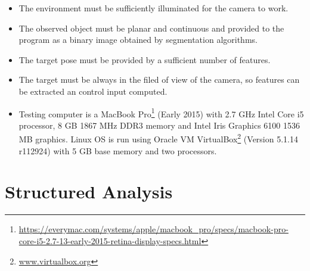 \begin{itemize}
	\item The environment must be sufficiently illuminated for the camera to work.
	\item The observed object must be planar and continuous and provided to the program as a binary image obtained by segmentation algorithms.
	\item The target pose must be provided by a sufficient number of features.
	\item The target must be always in the filed of view of the camera, so features can be extracted an control input computed.
	\item Testing computer is a MacBook Pro\footnote{\url{https://everymac.com/systems/apple/macbook_pro/specs/macbook-pro-core-i5-2.7-13-early-2015-retina-display-specs.html}} (Early 2015) with 2.7 GHz Intel Core i5 processor, 8 GB 1867 MHz DDR3 memory and Intel Iris Graphics 6100 1536 MB graphics. Linux OS is run using Oracle VM VirtualBox\footnote{\url{www.virtualbox.org}} (Version 5.1.14 r112924) with 5 GB base memory and two processors.
\end{itemize}


\section{Structured Analysis}
\label{sec:sa}
